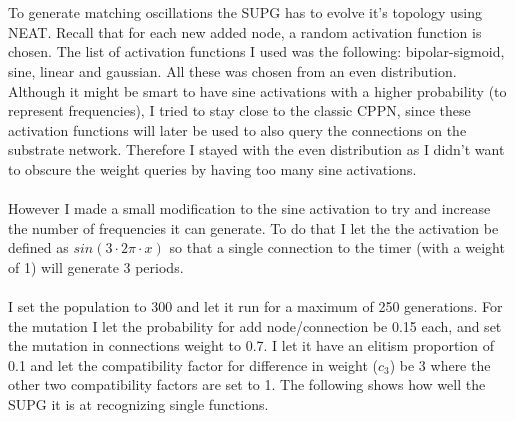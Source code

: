 \documentclass[11pt, a4paper]{article}
\begin{document}
\\
\\
To generate matching oscillations the SUPG has to evolve it's topology using NEAT. Recall that for each new added node, a random activation function is chosen. The list of activation functions I used was the following: bipolar-sigmoid, sine, linear and gaussian. All these was chosen from an even distribution. Although it might be smart to have sine activations with a higher probability (to represent frequencies), I tried to stay close to the classic CPPN, since these activation functions will later be used to also query the connections on the substrate network. Therefore I stayed with the even distribution as I didn't want to obscure the weight queries by having too many sine activations.
\\
\\
However I made a small modification to the sine activation to try and increase the number of frequencies it can generate. To do that I let the the activation be defined as $ sin(3 \cdot2\pi \cdot x) $ so that a single connection to the timer (with a weight of 1) will generate 3 periods.
\\
\\
I set the population to 300 and let it run for a maximum of 250 generations. For the mutation I let the probability for add node/connection be 0.15 each, and set the mutation in connections weight to 0.7. I let it have an elitism proportion of 0.1 and let the compatibility factor for difference in weight ($ c_3 $) be 3 where the other two compatibility factors are set to 1. The following shows how well the SUPG it is at recognizing single functions.
\end{document}
